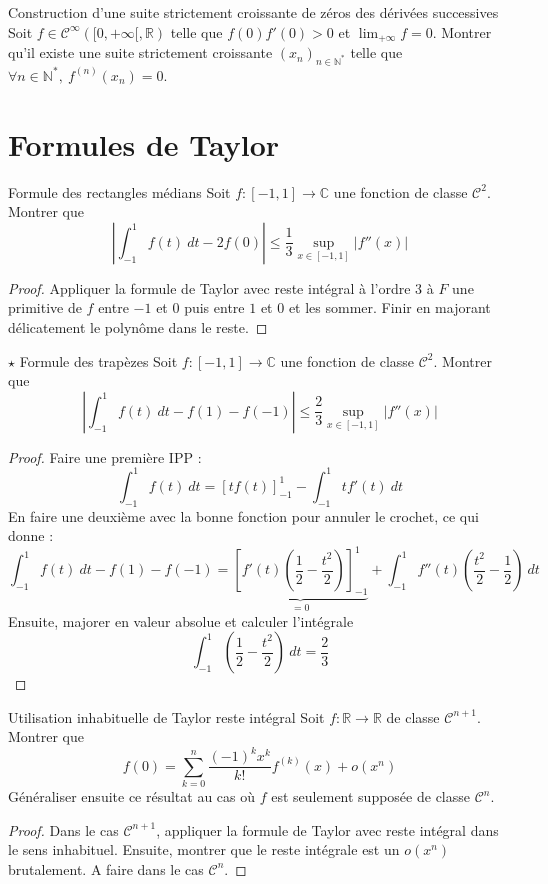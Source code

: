 \documentclass[french,a4paper]{article}
\newcommand{\N}{\mathbb{N}}
\newcommand{\R}{\mathbb{R}}
\newcommand{\C}{\mathbb{C}}
\newcommand{\st}{^*}
\theoremstyle{plain}
\theoremstyle{definition}
\theoremstyle{remark}
\begin{document}
\begin{ex}[Moulin.FV.20]{Construction d'une suite strictement croissante de zéros des dérivées successives}
	Soit $f\in\mathcal{C}^{\infty}([0,+\infty[,\R)$ telle que $f(0)f'(0)>0$ et $\lim_{+\infty}f=0$. Montrer qu'il existe une suite strictement croissante $(x_n)_{n\in\N\st}$ telle que $\forall n\in\N\st,\ f^{(n)}(x_n)=0$.
\end{ex}

\section{Formules de Taylor}

\begin{ex}[Moulin.FV.21]{Formule des rectangles médians}
	Soit $f:[-1,1]\to\C$ une fonction de classe $\mathcal{C}^2$. Montrer que $$\left\lvert\int_{-1}^{1}f(t)\ dt-2f(0)\right\rvert\leqslant\frac{1}{3}\underset{x\in[-1,1]}{\sup}\lvert f''(x)\rvert$$
\end{ex}
\begin{proof}
	Appliquer la formule de Taylor avec reste intégral à l'ordre $3$ à $F$ une primitive de $f$ entre $-1$ et $0$ puis entre $1$ et $0$ et les sommer. Finir en majorant délicatement le polynôme dans le reste.
\end{proof}

\begin{ex}[Moulin.FV.22]{$\star$ Formule des trapèzes}
	Soit $f:[-1,1]\to\C$ une fonction de classe $\mathcal{C}^2$. Montrer que $$\left\lvert\int_{-1}^{1}f(t)\ dt-f(1)-f(-1)\right\rvert\leqslant\frac{2}{3}\underset{x\in[-1,1]}{\sup}\lvert f''(x)\rvert$$
\end{ex}
\begin{proof}
	Faire une première IPP : $$\int_{-1}^{1}f(t)\ dt=\left[tf(t)\right]_{-1}^1-\int_{-1}^{1}tf'(t)\ dt$$ En faire une deuxième avec la bonne fonction pour annuler le crochet, ce qui donne : $$\int_{-1}^{1}f(t)\ dt-f(1)-f(-1)=\underbrace{\left[f'(t)\left(\frac{1}{2}-\frac{t^2}{2}\right)\right]_{-1}^1}_{=0}+\int_{-1}^{1}f''(t)\left(\frac{t^2}{2}-\frac{1}{2}\right)\ dt$$ Ensuite, majorer en valeur absolue et calculer l'intégrale $$\int_{-1}^{1}\left(\frac{1}{2}-\frac{t^2}{2}\right)\ dt=\frac{2}{3}$$
\end{proof}

\begin{ex}[Moulin.FV.23]{Utilisation inhabituelle de Taylor reste intégral}
	Soit $f:\R\to\R$ de classe $\mathcal{C}^{n+1}$. Montrer que $$f(0)=\sum_{k=0}^{n}\frac{(-1)^kx^k}{k!}f^{(k)}(x)+o(x^n)$$ Généraliser ensuite ce résultat au cas où $f$ est seulement supposée de classe $\mathcal{C}^{n}$.
\end{ex}
\begin{proof}
	Dans le cas $\mathcal{C}^{n+1}$, appliquer la formule de Taylor avec reste intégral dans le sens inhabituel. Ensuite, montrer que le reste intégrale est un $o(x^n)$ brutalement. A faire dans le cas $\mathcal{C}^n$.
\end{proof}
\end{document}
